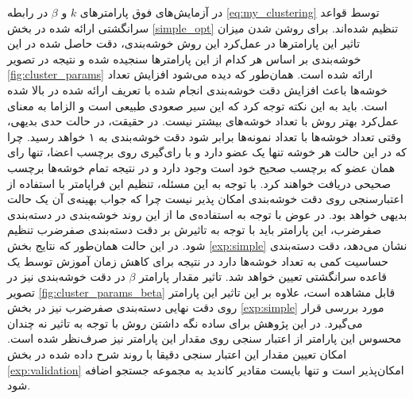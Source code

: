  در آزمایش‌های فوق پارامترهای $k$ و $\beta$ در رابطه \eqref{eq:my_clustering} توسط قواعد سرانگشتی ارائه شده در بخش \ref{simple_opt} تنظیم شده‌اند. برای روشن شدن میزان تاثیر این پارامترها در عمل‌کرد این روش خوشه‌بندی، دقت حاصل شده در این خوشه‌بندی بر اساس هر کدام از این پارامترها سنجیده شده و نتیجه در تصویر \ref{fig:cluster_params} ارائه شده است.
 همان‌طور که دیده می‌شود افزایش تعداد خوشه‌ها باعث افزایش دقت خوشه‌بندی انجام شده با تعریف ارائه شده در بالا شده است. باید به این نکته توجه کرد که این سیر صعودی طبیعی است و الزاما به معنای عمل‌کرد بهتر روش با تعداد خوشه‌های بیشتر نیست. در حقیقت، در حالت حدی بدیهی، وقتی تعداد خوشه‌ها با تعداد نمونه‌ها برابر شود دقت خوشه‌بندی به ۱ خواهد رسید. چرا که در این حالت هر خوشه تنها یک عضو دارد و با رای‌گیری روی برچسب اعضا، تنها رای همان عضو که برچسب صحیح خود است وجود دارد و در نتیجه تمام خوشه‌ها برچسب صحیحی دریافت خواهند کرد. با توجه به این مسئله، تنظیم این فراپامتر با استفاده از اعتبارسنجی روی دقت خوشه‌بندی امکان پذیر نیست چرا که جواب بهینه‌ی آن یک حالت بدیهی خواهد بود. در عوض با توجه به استفاده‌ی ما از این روند خوشه‌بندی در دسته‌بندی صفرضرب، این پارامتر باید با توجه به تاثیرش بر دقت دسته‌بندی صفرضرب تنظیم شود. در این حالت همان‌طور که نتایج بخش \ref{exp:simple} نشان می‌دهد، دقت دسته‌بندی حساسیت کمی به تعداد خوشه‌ها دارد در نتیجه برای کاهش زمان آموزش توسط یک قاعده سرانگشتی تعیین خواهد شد. 
 تاثیر مقدار پارامتر $\beta$ در دقت خوشه‌بندی نیز در تصویر \ref{fig:cluster_params_beta} قابل مشاهده است، علاوه بر این تاثیر این پارامتر روی دقت نهایی دسته‌بندی صفرضرب نیز در بخش \ref{exp:simple} مورد بررسی قرار می‌گیرد. در این پژوهش برای ساده نگه داشتن روش با توجه به تاثیر نه چندان محسوس این پارامتر از اعتبار سنجی روی مقدار این پارامتر نیز صرف‌نظر شده است. امکان تعیین مقدار این اعتبار سنجی دقیقا با روند شرح داده شده در بخش \ref{exp:validation} امکان‌پذیر است و تنها بایست مقادیر کاندید به مجموعه جستجو اضافه شود.
